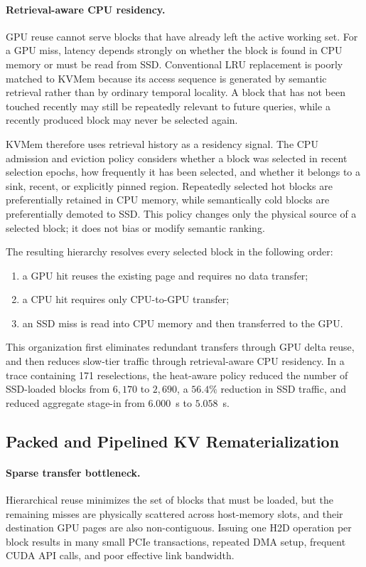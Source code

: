 \paragraph{Retrieval-aware CPU residency.}
GPU reuse cannot serve blocks that have already left the active working set.
For a GPU miss, latency depends strongly on whether the block is found in CPU
memory or must be read from SSD.  Conventional LRU replacement is poorly
matched to KVMem because its access sequence is generated by semantic
retrieval rather than by ordinary temporal locality.  A block that has not
been touched recently may still be repeatedly relevant to future queries,
while a recently produced block may never be selected again.

KVMem therefore uses retrieval history as a residency signal.  The CPU
admission and eviction policy considers whether a block was selected in recent
selection epochs, how frequently it has been selected, and whether it belongs
to a sink, recent, or explicitly pinned region.  Repeatedly selected hot
blocks are preferentially retained in CPU memory, while semantically cold
blocks are preferentially demoted to SSD.  This policy changes only the
physical source of a selected block; it does not bias or modify semantic
ranking.

The resulting hierarchy resolves every selected block in the following order:
\begin{enumerate}
  \item a GPU hit reuses the existing page and requires no data transfer;
  \item a CPU hit requires only CPU-to-GPU transfer;
  \item an SSD miss is read into CPU memory and then transferred to the GPU.
\end{enumerate}
This organization first eliminates redundant transfers through GPU delta
reuse, and then reduces slow-tier traffic through retrieval-aware CPU
residency.  In a trace containing 171 reselections, the heat-aware policy
reduced the number of SSD-loaded blocks from \(6{,}170\) to \(2{,}690\), a
\(56.4\%\) reduction in SSD traffic, and reduced aggregate stage-in from
\(6.000\)~s to \(5.058\)~s.

\subsection{Packed and Pipelined KV Rematerialization}
\label{sec:packed-pipelined-rematerialization}

\paragraph{Sparse transfer bottleneck.}
Hierarchical reuse minimizes the set of blocks that must be loaded, but the
remaining misses are physically scattered across host-memory slots, and their
destination GPU pages are also non-contiguous.  Issuing one H2D operation per
block results in many small PCIe transactions, repeated DMA setup, frequent
CUDA API calls, and poor effective link bandwidth.

